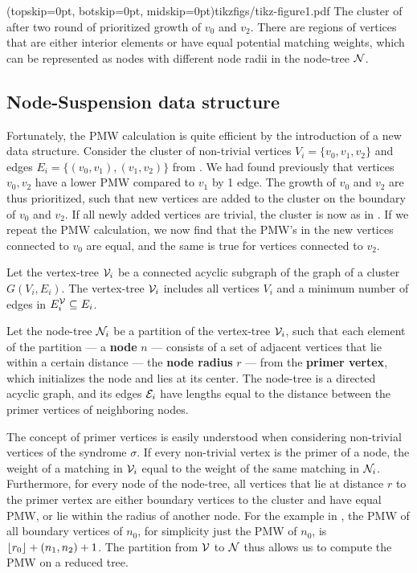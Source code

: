 \Figure[htb](topskip=0pt, botskip=0pt, midskip=0pt){tikzfigs/tikz-figure1.pdf}{
    The cluster of  after two round of prioritized growth of $v_0$ and $v_2$. There are regions of vertices that are either interior elements or have equal potential matching weights, which can be represented as nodes with different node radii in the node-tree $\mathcal{N}$. \label{fig1}}

\subsection{Node-Suspension data structure}\label{sec:nodeset}

Fortunately, the PMW calculation is quite efficient by the introduction of a new data structure. Consider the cluster of non-trivial vertices $V_i=\{v_0,v_1,v_2\}$ and edges $E_i = \{(v_0,v_1), (v_1, v_2)\}$ from . We had found previously that vertices $v_0, v_2$ have a lower PMW compared to $v_1$ by 1 edge. The growth of $v_0$ and $v_2$ are thus prioritized, such that new vertices are added to the cluster on the boundary of $v_0$ and $v_2$. If all newly added vertices are trivial, the cluster is now as in . If we repeat the PMW calculation, we now find that the PMW's in the new vertices connected to $v_0$ are equal, and the same is true for vertices connected to $v_2$. 
\begin{definition}\label{def:vertextree}
    Let the vertex-tree $\mathcal{V}_i$ be a connected acyclic subgraph of the graph of a cluster $G(V_i, E_i)$.   The vertex-tree $\mathcal{V}_i$ includes all vertices $V_i$ and a minimum number of edges in $E^{\mathcal{V}}_i \subseteq E_i$. 
\end{definition}
\begin{definition}
  Let the node-tree $\mathcal{N}_i$ be a partition of the vertex-tree $\mathcal{V}_i$, such that each element of the partition --- a \textbf{node} $n$ --- consists of a set of adjacent vertices that lie within a certain distance --- the \textbf{node radius} $r$ --- from the \textbf{primer vertex}, which initializes the node and lies at its center. The node-tree is a directed acyclic graph, and its edges $\mathcal{E}_i$ have lengths equal to the distance between the primer vertices of neighboring nodes. 
\end{definition}

The concept of primer vertices is easily understood when considering non-trivial vertices of the syndrome $\sigma$. If every non-trivial vertex is the primer of a node, the weight of a matching in $\mathcal{V}_i$ equal to the weight of the same matching in $\mathcal{N}_i$. Furthermore, for every node of the node-tree, all vertices that lie at distance $r$ to the primer vertex are either boundary vertices to the cluster and have equal PMW, or lie within the radius of another node. For the example in , the PMW of all boundary vertices of $n_0$, for simplicity just the PMW of $n_0$, is ${\left \lfloor r_0 \right \rfloor } + (n_1, n_2) + 1$. The partition from $\mathcal{V}$ to $\mathcal{N}$ thus allows us to compute the PMW on a reduced tree. 

